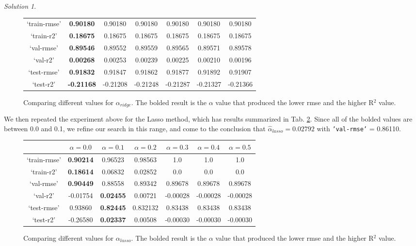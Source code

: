 \documentclass[a4paper,12pt]{article}
\theoremstyle{definition}
\theoremstyle{remark}
\newtheorem*{solution}{Solution}
\begin{document}
\begin{enumerate}
\begin{enumerate}
\begin{solution}
\begin{figure}
\begin{tabular}{c|cccccc}
					\hline\hline
					`train-rmse'&\textbf{0.90180}&0.90180&0.90180&0.90180&0.90180&0.90180\\
					`train-r2'& \textbf{0.18675}&0.18675&0.18675&0.18675&0.18675&0.18675\\
					\hline
					`val-rmse'& \textbf{0.89546}&0.89552&0.89559&0.89565&0.89571&0.89578\\
					`val-r2'& \textbf{0.00268}&0.00253&0.00239&0.00225&0.00210&0.00196\\
					\hline
					`test-rmse'&\textbf{0.91832}&0.91847&0.91862&0.91877&0.91892&0.91907\\
					`test-r2'&\textbf{-0.21168}&-0.21208&-0.21248&-0.21287&-0.21327&-0.21366
				\end{tabular}
				\caption{Comparing different values for $\alpha_{ridge}$. The bolded result is the $\alpha$ value that produced the lower rmse and the higher R$^2$ value.}
				\label{tab: Ridgealphavals}
			\end{figure}
			
	We then repeated the experiment above for the Lasso method, which has results summarized in Tab. \ref{tab: Lassoalphavals}. Since all of the bolded values are between 0.0 and 0.1, we refine our search in this range, and come to the conclusion that $\hat{\alpha}_{lasso} =  0.02792$ with \texttt{'val-rmse'} =  0.86110.

				\begin{figure}
				\centering
				\begin{tabular}{c|cccccc}
					& $\alpha = 0.0$ &$\alpha = 0.1$ &$\alpha = 0.2$ &$\alpha = 0.3$&$\alpha = 0.4$&$\alpha = 0.5$ \\
					\hline\hline
					`train-rmse'&\textbf{0.90214} & 0.96523 &0.98563&1.0&1.0&1.0\\
					`train-r2'& \textbf{0.18614 }& 0.06832&0.02852&0.0 &0.0&0.0\\
					\hline
					`val-rmse'&\textbf{ 0.90449} &0.88558 &0.89342&0.89678&0.89678&0.89678\\
					`val-r2'& -0.01754& \textbf{0.02455}&0.00721&-0.00028&-0.00028&-0.00028\\
					\hline
					`test-rmse'&0.93860&\textbf{ 0.82445}&0.832132&0.83438& 0.83438&0.83438\\
					`test-r2'& -0.26580&\textbf{0.02337}&0.00508&-0.00030& -0.00030&-0.00030\\
				\end{tabular}
				\caption{Comparing different values for $\alpha_{lasso}$. The bolded result is the $\alpha$ value that produced the lower rmse and the higher R$^2$ value.}
				\label{tab: Lassoalphavals}
			\end{figure}


\end{solution}
\end{enumerate}
\end{enumerate}
\end{document}
